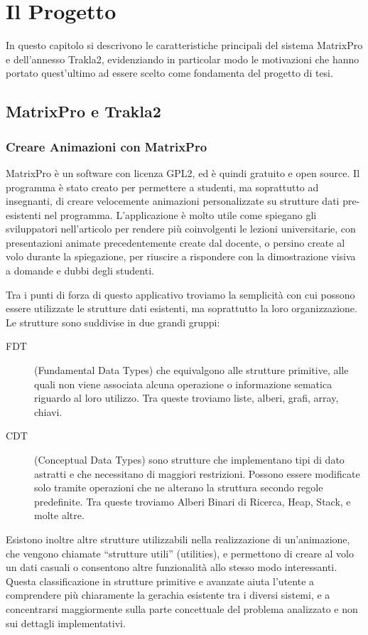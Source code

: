 
\chapter{Il Progetto}

In questo capitolo si descrivono le caratteristiche principali del
sistema MatrixPro e dell'annesso Trakla2, evidenziando in particolar
modo le motivazioni che hanno portato quest'ultimo ad essere scelto
come fondamenta del progetto di tesi.


\section{\label{sec:MatrixPro-e-Trackla2}MatrixPro e Trakla2}


\subsection{Creare Animazioni con MatrixPro}

MatrixPro \cite{MatrixPro} è un software con licenza GPL2, ed è quindi
gratuito e open source. Il programma è stato creato per permettere
a studenti, ma soprattutto ad insegnanti, di creare velocemente animazioni
personalizzate su strutture dati pre-esistenti nel programma. L'applicazione
è molto utile come spiegano gli sviluppatori nell'articolo \cite{MatrixPro}
per rendere più coinvolgenti le lezioni universitarie, con presentazioni
animate precedentemente create dal docente, o persino create al volo
durante la spiegazione, per riuscire a rispondere con la dimostrazione
visiva a domande e dubbi degli studenti.

Tra i punti di forza di questo applicativo troviamo la semplicità
con cui possono essere utilizzate le strutture dati esistenti, ma
soprattutto la loro organizzazione. Le strutture sono suddivise in
due grandi gruppi: 
\begin{description}
\item [{{FDT}}] (Fundamental Data Types) che equivalgono alle strutture
primitive, alle quali non viene associata alcuna operazione o informazione
sematica riguardo al loro utilizzo. Tra queste troviamo liste, alberi,
grafi, array, chiavi. 
\item [{{CDT}}] (Conceptual Data Types) sono strutture che implementano
tipi di dato astratti e che necessitano di maggiori restrizioni. Possono
essere modificate solo tramite operazioni che ne alterano la struttura
secondo regole predefinite. Tra queste troviamo Alberi Binari di Ricerca,
Heap, Stack, e molte altre. 
\end{description}
Esistono inoltre altre strutture utilizzabili nella realizzazione
di un'animazione, che vengono chiamate {}``strutture utili'' (utilities),
e permettono di creare al volo un dati casuali o consentono altre
funzionalità allo stesso modo interessanti. Questa classificazione
in strutture primitive e avanzate aiuta l'utente a comprendere più
chiaramente la gerachia esistente tra i diversi sistemi, e a concentrarsi
maggiormente sulla parte concettuale del problema analizzato e non
sui dettagli implementativi.

